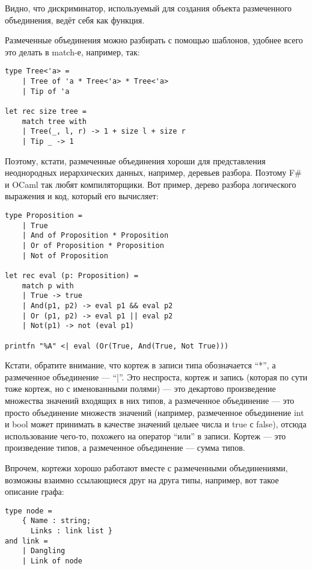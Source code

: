 \documentclass[a5paper]{article}
\begin{document}
Видно, что дискриминатор, используемый для создания объекта размеченного объединения, ведёт себя как функция.

Размеченные объединения можно разбирать с помощью шаблонов, удобнее всего это делать в match-е, например, так:

\begin{verbatim}
type Tree<'a> =
    | Tree of 'a * Tree<'a> * Tree<'a>
    | Tip of 'a

let rec size tree =
    match tree with
    | Tree(_, l, r) -> 1 + size l + size r
    | Tip _ -> 1
\end{verbatim}

Поэтому, кстати, размеченные объединения хороши для представления неоднородных иерархических данных, например, деревьев разбора. Поэтому F\# и OCaml так любят компиляторщики. Вот пример, дерево разбора логического выражения и код, который его вычисляет:

\begin{verbatim}
type Proposition =
    | True
    | And of Proposition * Proposition
    | Or of Proposition * Proposition
    | Not of Proposition

let rec eval (p: Proposition) =
    match p with
    | True -> true
    | And(p1, p2) -> eval p1 && eval p2
    | Or (p1, p2) -> eval p1 || eval p2
    | Not(p1) -> not (eval p1)

printfn "%A" <| eval (Or(True, And(True, Not True)))
\end{verbatim}

Кстати, обратите внимание, что кортеж в записи типа обозначается ``*'', а размеченное объединение --- ``|''. Это неспроста, кортеж и запись (которая по сути тоже кортеж, но с именованными полями) --- это декартово произведение множества значений входящих в них типов, а размеченное объединение --- это просто объединение множеств значений (например, размеченное объединение int и bool может принимать в качестве значений целыее числа и true с false), отсюда использование чего-то, похожего на оператор ``или'' в записи. Кортеж --- это произведение типов, а размеченное объединение --- сумма типов.

Впрочем, кортежи хорошо работают вместе с размеченными объединениями, возможны взаимно ссылающиеся друг на друга типы, например, вот такое описание графа:

\begin{verbatim}
type node =
    { Name : string;
      Links : link list }
and link =
    | Dangling
    | Link of node
\end{verbatim}
\end{document}
